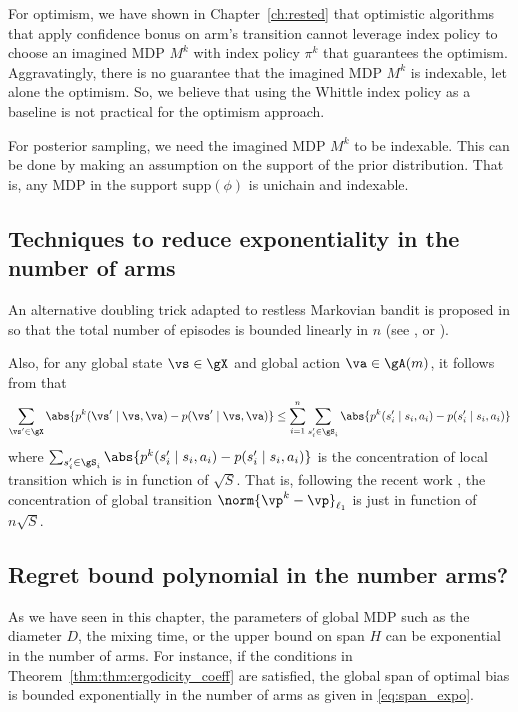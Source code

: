 For optimism, we have shown in Chapter~\ref{ch:rested} that optimistic algorithms that apply confidence bonus on arm's transition cannot leverage index policy to choose an imagined MDP $M^k$ with index policy $\pi^k$ that guarantees the optimism.
Aggravatingly, there is no guarantee that the imagined MDP $M^k$ is indexable, let alone the optimism.
So, we believe that using the Whittle index policy as a baseline is not practical for the optimism approach.

For posterior sampling, we need the imagined MDP $M^k$ to be indexable.
This can be done by making an assumption on the support of the prior distribution.
That is, any MDP in the support $\mathrm{supp}(\phi)$ is unichain and indexable.

\subsection{Techniques to reduce exponentiality in the number of arms}

An alternative doubling trick adapted to restless Markovian bandit is proposed in \cite{ortner2012regret, jung2019thompson, akbarzadeh2022learning} so that the total number of episodes is bounded linearly in $n$ (see \eg, \cite[Lemma~A.1]{akbarzadeh2022learning} or \cite[Lemma~8]{jung2019thompson}).

Also, for any global state $\vs\in\gX$ and global action $\va\in\gA(m)$, it follows from \cite[Lemma~13]{jung2019thompson} that
\begin{align*}
    \sum_{\vs'\in\gX} \abs{p^k(\vs'\mid \vs,\va) -p(\vs'\mid \vs,\va)}
    \le \sum_{i=1}^{n} \sum_{s'_i\in\gS_i} \abs{p^k(s'_i\mid s_i,a_i) -p(s'_i\mid s_i,a_i)}
\end{align*}
where $\sum_{s'_i\in\gS_i} \abs{p^k(s'_i\mid s_i,a_i) -p(s'_i\mid s_i,a_i)}$ is the concentration of local transition which is in function of $\sqrt{S}$.
That is, following the recent work \cite{ortner2012regret, jung2019thompson, akbarzadeh2022learning}, the concentration of global transition $\norm{\vp^k-\vp}_{\ell_1}$ is just in function of $n\sqrt{S}$.

\subsection*{Regret bound polynomial in the number arms?}

As we have seen in this chapter, the parameters of global MDP such as the diameter $D$, the mixing time, or the upper bound on span $H$ can be exponential in the number of arms.
For instance, if the conditions in Theorem~\ref{thm:thm:ergodicity_coeff} are satisfied, the global span of optimal bias is bounded exponentially in the number of arms as given in \eqref{eq:span_expo}.

